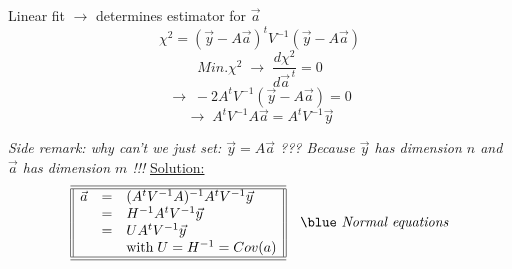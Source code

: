 \begin{slide}
\Large
\pagestyle{headings}
\sf
{}
Linear fit $\rightarrow$ determines estimator for $\vec{a}$
\[ \chi^2 = (\vec{y} - A\vec{a})^{t} V^{-1} 
            (\vec{y} - A\vec{a}) \]
\[Min. \chi^2 \;\rightarrow \;\frac{d\chi^2}{d\vec{a}^{\,t}}  = 0 \]
\[ \rightarrow \;-2 A^t V^{-1} (\vec{y} - A \vec{a}) = 0
\]
\[ \rightarrow \; A^t V^{-1} A \vec{a} = A^{t} V^{-1} \vec{y} \]

\noindent
{\em Side remark: why can't we just set: 
$\vec{y} = A \vec{a}$ ??? Because 
$\vec{y}$ has dimension
$n$ and $\vec{a}$ has dimension $m$ !!!
}
\noindent
\underline{Solution:}
\[ 
\begin{array}{||lll||} 
\hline
\hline
\vec{a} &  = &   (A^t V^{-1} A)^{-1} A^t V^{-1} \vec{y}  \\
 & = & H^{-1} A^t V^{-1} \vec{y} \\
 & = & U A^t V^{-1} \vec{y} \\
 & & \mbox{with}\; U= H^{-1} = Cov(a) \\ 
\hline
\hline
\end{array}
\quad
\mbox{\blue \em Normal equations}
\]
%
%
\end{slide} 

